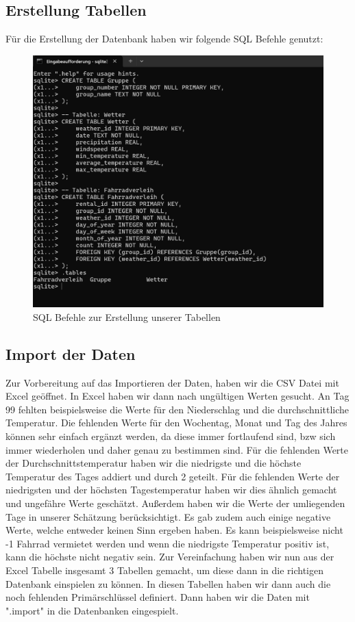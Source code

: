 \documentclass[a4paper,11pt]{article}
\begin{document}
 
\subsection{Erstellung Tabellen}
Für die Erstellung der Datenbank haben wir folgende SQL Befehle genutzt: 


\begin{figure}[h]
\centering
\includegraphics[scale=.5]{Tabellen erstellen.png}
\caption{SQL Befehle zur Erstellung unserer Tabellen}
\label{fig:meine-grafik2}
\end{figure}

\subsection{Import der Daten}
Zur Vorbereitung auf das Importieren der Daten, haben wir die CSV Datei mit Excel geöffnet. In Excel haben wir dann nach ungültigen Werten gesucht. An Tag 99 fehlten beispielsweise die Werte für den Niederschlag und die durchschnittliche Temperatur. Die fehlenden Werte für den Wochentag, Monat und Tag des Jahres können sehr einfach ergänzt werden, da diese immer fortlaufend sind, bzw sich immer wiederholen und daher genau zu bestimmen sind. Für die fehlenden Werte der Durchschnittstemperatur haben wir die niedrigste und die höchste Temperatur des Tages addiert und durch 2 geteilt. Für die fehlenden Werte der niedrigsten und der höchsten Tagestemperatur haben wir dies ähnlich gemacht und ungefähre Werte geschätzt. Außerdem haben wir die Werte der umliegenden Tage in unserer Schätzung berücksichtigt. Es gab zudem auch einige negative Werte, welche entweder keinen Sinn ergeben haben. Es kann beispielsweise nicht -1 Fahrrad vermietet werden und wenn die niedrigste Temperatur positiv ist, kann die höchste nicht negativ sein.
Zur Vereinfachung haben wir nun aus der Excel Tabelle insgesamt 3 Tabellen gemacht, um diese dann in die richtigen Datenbank einspielen zu können. In diesen Tabellen haben wir dann auch die noch fehlenden Primärschlüssel definiert. 
Dann haben wir die Daten mit ".import" in die Datenbanken eingespielt. 
\end{document}
